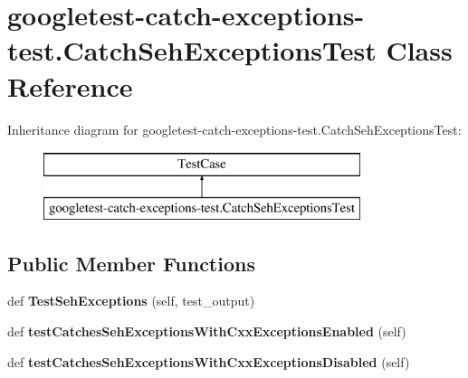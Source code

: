 \hypertarget{classgoogletest-catch-exceptions-test_1_1_catch_seh_exceptions_test}{}\section{googletest-\/catch-\/exceptions-\/test.Catch\+Seh\+Exceptions\+Test Class Reference}
\label{classgoogletest-catch-exceptions-test_1_1_catch_seh_exceptions_test}
Inheritance diagram for googletest-\/catch-\/exceptions-\/test.Catch\+Seh\+Exceptions\+Test\+:\begin{figure}[H]
\begin{center}
\leavevmode
\includegraphics[height=2.000000cm]{classgoogletest-catch-exceptions-test_1_1_catch_seh_exceptions_test}
\end{center}
\end{figure}
\subsection*{Public Member Functions}
\begin{DoxyCompactItemize}
\item 
\mbox{\label{classgoogletest-catch-exceptions-test_1_1_catch_seh_exceptions_test_a86d5639a464b9ee5e05816758bd1ae1f}} 
def {\bfseries Test\+Seh\+Exceptions} (self, test\+\_\+output)
\item 
\mbox{\label{classgoogletest-catch-exceptions-test_1_1_catch_seh_exceptions_test_abfb6b8448b7af79621f6f663e40ebca3}} 
def {\bfseries test\+Catches\+Seh\+Exceptions\+With\+Cxx\+Exceptions\+Enabled} (self)
\item 
\mbox{\label{classgoogletest-catch-exceptions-test_1_1_catch_seh_exceptions_test_a8e448244058ea16b0ba3148678c0b9e6}} 
def {\bfseries test\+Catches\+Seh\+Exceptions\+With\+Cxx\+Exceptions\+Disabled} (self)
\end{DoxyCompactItemize}


